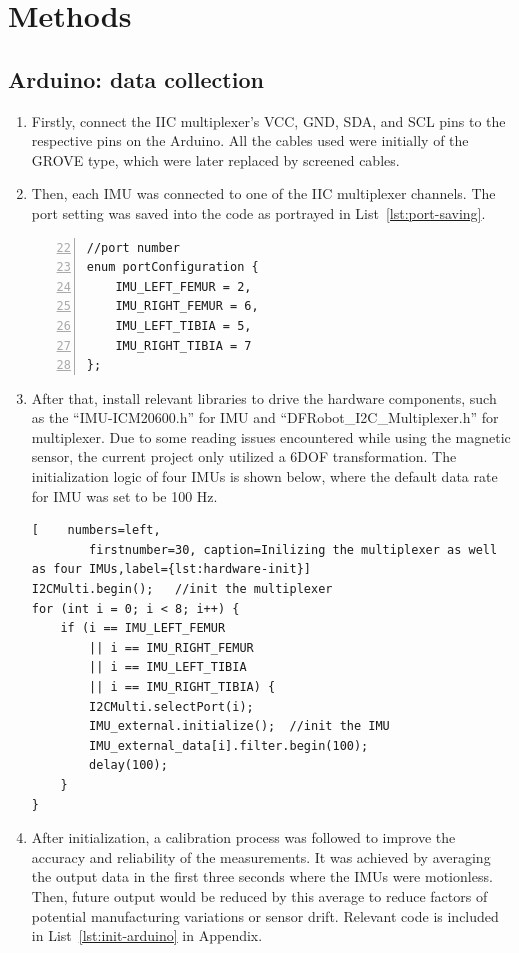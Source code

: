 \section{Methods}


\subsection{Arduino: data collection}\label{subsec:data-fetching}
\begin{enumerate}
	\item   Firstly, connect the IIC multiplexer's VCC, GND, SDA, and SCL pins to the respective pins on the Arduino.
	All the cables used were initially of the GROVE type, which were later replaced by screened cables.
	\item   Then, each IMU was connected to one of the IIC multiplexer channels.
	The port setting was saved into the code as portrayed in List~\ref{lst:port-saving}.

	\lstset{language=C++}
	\begin{lstlisting}[caption=Saving the port setting of four IMUs.,    numbers=left,
		firstnumber=22, label={lst:port-saving}]
//port number
enum portConfiguration {
    IMU_LEFT_FEMUR = 2,
    IMU_RIGHT_FEMUR = 6,
    IMU_LEFT_TIBIA = 5,
    IMU_RIGHT_TIBIA = 7
};
	\end{lstlisting}

	\item   After that, install relevant libraries to drive the hardware components, such as the ``IMU-ICM20600.h'' for IMU and ``DFRobot\_I2C\_Multiplexer.h'' for multiplexer.
	Due to some reading issues encountered while using the magnetic sensor, the current project only utilized a 6DOF transformation.
	The initialization logic of four IMUs is shown below, where the default data rate for IMU was set to be 100 Hz.

	\lstset{language=C++}
	\begin{lstlisting}[    numbers=left,
		firstnumber=30, caption=Inilizing the multiplexer as well as four IMUs,label={lst:hardware-init}]
I2CMulti.begin();   //init the multiplexer
for (int i = 0; i < 8; i++) {
    if (i == IMU_LEFT_FEMUR
        || i == IMU_RIGHT_FEMUR
        || i == IMU_LEFT_TIBIA
        || i == IMU_RIGHT_TIBIA) {
        I2CMulti.selectPort(i);
        IMU_external.initialize();  //init the IMU
        IMU_external_data[i].filter.begin(100);
        delay(100);
    }
}
	\end{lstlisting}

	\item   After initialization, a calibration process was followed to improve the accuracy and reliability of the measurements.
	It was achieved by averaging the output data in the first three seconds where the IMUs were motionless.
	Then, future output would be reduced by this average to reduce factors of potential manufacturing variations or sensor drift.
	Relevant code is included in List~\ref{lst:init-arduino} in Appendix.


\end{enumerate}
